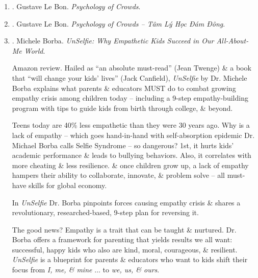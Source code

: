 \documentclass{article}
\begin{document}
\begin{enumerate}
	\item \cite{Bon_crowd_psychology}. {\sc Gustave Le Bon}. {\it Psychology of Crowds}.
	
	\item \cite{Bon_crowd_psychology_VN}. {\sc Gustave Le Bon}. {\it Psychology of Crowds -- Tâm Lý Học Đám Đông}.\hfill{\sf[done]}
	
	\item \cite{Borba_sympathy}. {\sc Michele Borba}. {\it UnSelfie: Why Empathetic Kids Succeed in Our All-About-Me World}. {}
	
	{\sf Amazon review.} Hailed as ``an absolute must-read'' ({\sc Jean Twenge}) \& a book that ``will change your kids' lives'' ({\sc Jack Canfield}), {\it UnSelfie} by Dr. {\sc Michele Borba} explains what parents \& educators MUST do to combat growing empathy crisis among children today -- including a 9-step empathy-building program with tips to guide kids from birth through college, \& beyond.
	
	Teens today are 40\% less empathetic than they were 30 years ago. Why is a lack of empathy -- which goes hand-in-hand with self-absorption epidemic Dr. {\sc Michael Borba} calls Selfie Syndrome -- so dangerous? 1st, it hurts kids' academic performance \& leads to bullying behaviors. Also, it correlates with more cheating \& less resilience. \& once children grow up, a lack of empathy hampers their ability to collaborate, innovate, \& problem solve -- all must-have skills for global economy.
	
	In {\it UnSelfie} Dr. {\sc Borba} pinpoints forces causing empathy crisis \& shares a revolutionary, researched-based, 9-step plan for reversing it.
	
	The good news? Empathy is a trait that can be taught \& nurtured. Dr. {\sc Borba} offers a framework for parenting that yields results we all want: successful, happy kids who also are kind, moral, courageous, \& resilient. {\it UnSelfie} is a blueprint for parents \& educators who want to kids shift their focus from {\it I, me, \& mine} $\ldots$ to {\it we, us, \& ours}.
	

\end{enumerate}
\end{document}
